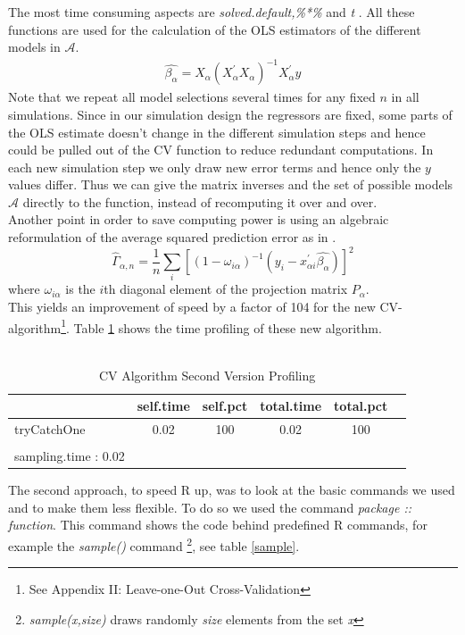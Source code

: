 \documentclass[Research_Module_ES.tex]{subfiles}
\begin{document}
The most time consuming aspects are {\itshape solved.default,\%*\%} and {\itshape t} . All these functions are used for the calculation of the OLS estimators of the different models in $\mathcal{A}$.
\begin{align*}
\hat{\beta_\alpha}=X_\alpha(X^\prime_\alpha X_\alpha)^{-1}X_\alpha^\prime y
\end{align*}
Note that we repeat all model selections several times for any fixed $n$ in all simulations. Since in our simulation design the regressors are fixed, some parts of the OLS estimate doesn't change in the different simulation steps and hence could be pulled out of the CV function to reduce redundant computations. In each new simulation step we only draw new error terms and hence only the $y$ values differ. Thus we can give the matrix inverses and the set of possible models $\mathcal{A}$ directly to the function, instead of recomputing it over and over.
\\
Another point in order to save computing power is using an algebraic reformulation of the average squared prediction error as in \cite{shao}.
\[
	\hat{\Gamma}_{\alpha,n}=\frac{1}{n}\sum_i[(1-\omega_{i\alpha})^{-1}(y_i-x^\prime_{\alpha i}\hat{\beta_\alpha})]^2
\]
where $\omega_{i\alpha}$ is the $i$th diagonal element of the projection matrix $P_\alpha$.\\
This yields an improvement of speed by a factor of 104 for the new CV-algorithm\footnote{See Appendix II: Leave-one-Out Cross-Validation}. Table \ref{CVneu} shows the time profiling of these new algorithm.\\
\\
\begin{table}[!h]
	\caption{CV Algorithm Second Version Profiling }
	\label{CVneu}
	\centering
	\begin{tabular}{lccccc}
		\toprule
		\midrule
		\textbf{\scriptsize }
		&\textbf{\scriptsize self.time}
		&\textbf{\scriptsize self.pct}
		&\textbf{\scriptsize total.time}
		&\textbf{\scriptsize total.pct}
		\\\midrule\midrule
		\scriptsize tryCatchOne & \scriptsize 0.02 & \scriptsize 100 &\scriptsize 0.02 & \scriptsize 100 \\
		\\
		\scriptsize sampling.time : 0.02
	\end{tabular}
\end{table}
The second approach, to speed R up,  was to look at the basic commands we used and to make them less flexible. To do so we used the command {\itshape package :: function}. This command shows the code behind predefined R commands, for example the {\itshape sample()} command \footnote{{\itshape sample(x,size)} draws randomly {\itshape size} elements from the set {\itshape x} }, see table \ref{sample}.
\end{document}
